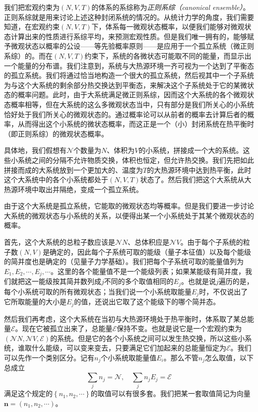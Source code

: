 \documentclass[main.tex]{subfiles}
\begin{document}
我们把宏观约束为$\left(N,V,T\right)$的体系的系综称为\emph{正则系综（canonical ensemble）}。正则系综就是用来讨论上述这种封闭系统的情况的。从统计力学的角度，我们需要知道，在宏观约束$\left(N,V,T\right)$下，体系每一微观状态概率，以便我们能够对微观状态计算出来的性质进行系综平均，来预测宏观性质。但是我们唯一拥有的，能够赋予微观状态以概率的公设——等先验概率原则——是应用于一个孤立系统（微正则系综）的。而在$\left(N,V,T\right)$约束下，系统的各微状态可能取不同的能量，而显示出一个能量的分布谱。我们注意到，系统与大热源环境一齐可视为一个达到了平衡态的孤立系统。我们将通过恰当地构造一个很大的孤立系统，然后视其中一个子系统为与这个大系统的剩余部分热交换达到平衡态，来解决这个子系统处于它的某微状态的概率问题。此时，由于大系统满足微正则系综，因而这个大系统的各个微观状态概率相等，但在大系统的这么多微观状态当中，只有部分是我们所关心的小系统恰好处于我们所关心的微观状态的。通过概率论可以从前者的概率去计算后者的概率，从而得出这个小系统的微状态概率，而这正是一个（小）封闭系统在热平衡时（即正则系综）的微观状态概率。

具体地，我们假想有$\mathcal{N}$个数量为$N$、体积为$V$的小系统，拼接成一个大的系统。这些小系统之间的分隔不允许物质交换，体积也恒定，但允许热交换。我们先把如此拼接而成的大系统放到一个更加大的、温度为$T$的大热源环境中达到热平衡，此时这个大系统中的各个小系统都处于$\left(N,V,T\right)$状态了。然后我们把这个大系统从大热源环境中取出并隔绝，变成一个孤立系统。

由于这个大系统是孤立系统，它能取的微观状态均等概率。但是我们要进一步讨论大系统的微观状态与小系统的关系，以便得出某一个小系统处于其某个微观状态的概率。

首先，这个大系统的总粒子数应该是$\mathcal{N}N$、总体积应是$\mathcal{N}V$。由于每个子系统的粒子数$\left(N,V\right)$是确定的，因此每个子系统可取的能级（量子本征值）以及每个能级的简并度也是确定的（见量子力学基础）。我们把每个子系统可取的能量值列为$E_1,E_2,\cdots,E_j,\cdots$。这里的各个能量值不是一个能级列表；如果某能级有简并度，我们就把这一能级按其简并数列成$j$不同的多个取值相同的$E_j$。也就是说$j$遍历的是，每个小系统可取的所有微观状态；当我们说一个小系统取能量$E_j$时，不仅说出了它所取能量的大小是$E_j$的值，还说出它取了这个能级下的哪个简并态。

然后我们再考虑，这个大系统在当初与大热源环境处于热平衡时，体系取了某总能量$\mathcal{E}$。现在它被孤立出来了，总能量$\mathcal{E}$保持不变。也就是说它是一个宏观约束为$\left(\mathcal{N}N,\mathcal{N}V,\mathcal{E}\right)$的系统。但是它的各个小系统之间可以发生热交换，所以这些小系统，谁取什么能级，可以变来变去，只要满足它们加起来的总能量恒定为$\mathcal{E}$。我们可以先作一个类别区分。记有$n_j$个小系统取能量值$E_i$。那么不管$n_j$怎么取值，以下总成立
\begin{equation}\label{eq:V.2_canonical_ensemble_constraints}
    \sum_jn_j=\mathcal{N},\quad\sum_jn_jE_j=\mathcal{E}
\end{equation}
满足这个规定的$\left\{n_1,n_2,\cdots\right\}$的取值可以有很多套。我们把某一套取值简记为向量$\mathbf{n}=\left(n_1,n_2,\cdots\right)$。
\end{document}
